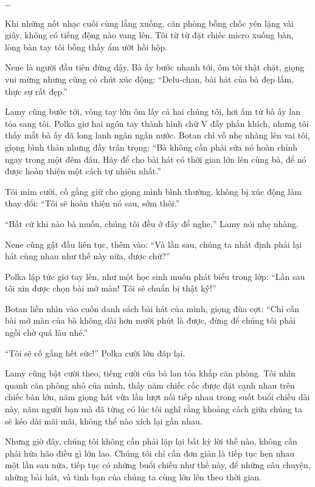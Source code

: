\documentclass[../main.tex]{subfiles}
\begin{document}
\dots

Khi những nốt nhạc cuối cùng lắng xuống, căn phòng bỗng chốc yên lặng vài giây, không có tiếng động nào vang lên. Tôi từ từ đặt chiếc micro xuống bàn, lòng bàn tay tôi bỗng thấy ẩm ướt hồi hộp.

Nene là người đầu tiên đứng dậy. Bà ấy bước nhanh tới, ôm tôi thật chặt, giọng vui mừng nhưng cũng có chút xúc động: ``Delu-chan, bài hát của bà đẹp lắm, thực sự rất đẹp.''

Lamy cũng bước tới, vòng tay lớn ôm lấy cả hai chúng tôi, hơi ấm từ bà ấy lan tỏa sang tôi. Polka giơ hai ngón tay thành hình chữ V đầy phấn khích, nhưng tôi thấy mắt bà ấy đã long lanh ngân ngấn nước. Botan chỉ vỗ nhẹ nhàng lên vai tôi, giọng bình thản nhưng đầy trân trọng: ``Bà không cần phải sửa nó hoàn chỉnh ngay trong một đêm đâu. Hãy để cho bài hát có thời gian lớn lên cùng bà, để nó được hoàn thiện một cách tự nhiên nhất.''

Tôi mỉm cười, cố gắng giữ cho giọng mình bình thường, không bị xúc động làm thay đổi: ``Tôi sẽ hoàn thiện nó sau, sớm thôi.''

``Bất cứ khi nào bà muốn, chúng tôi đều ở đây để nghe,'' Lamy nói nhẹ nhàng.

Nene cũng gật đầu liên tục, thêm vào: ``Và lần sau, chúng ta nhất định phải lại hát cùng nhau như thế này nữa, được chứ?''

Polka lập tức giơ tay lên, như một học sinh muốn phát biểu trong lớp: ``Lần sau tôi xin được chọn bài mở màn! Tôi sẽ chuẩn bị thật kỹ!''

Botan liền nhìn vào cuốn danh sách bài hát của mình, giọng đùa cợt: ``Chỉ cần bài mở màn của bà không dài hơn mười phút là được, đừng để chúng tôi phải ngồi chờ quá lâu nhé.''

``Tôi sẽ cố gắng hết sức!'' Polka cười lớn đáp lại.

Lamy cũng bật cười theo, tiếng cười của bà lan tỏa khắp căn phòng. Tôi nhìn quanh căn phòng nhỏ của mình, thấy năm chiếc cốc được đặt cạnh nhau trên chiếc bàn lớn, năm giọng hát vừa lần lượt nối tiếp nhau trong suốt buổi chiều dài này, năm người bạn mà đã từng có lúc tôi nghĩ rằng khoảng cách giữa chúng ta sẽ kéo dài mãi mãi, không thể nào xích lại gần nhau.

Nhưng giờ đây, chúng tôi không cần phải lặp lại bất kỳ lời thề nào, không cần phải hứa hão điều gì lớn lao. Chúng tôi chỉ cần đơn giản là tiếp tục hẹn nhau một lần sau nữa, tiếp tục có những buổi chiều như thế này, để những câu chuyện, những bài hát, và tình bạn của chúng ta cùng lớn lên theo thời gian.
\end{document}
